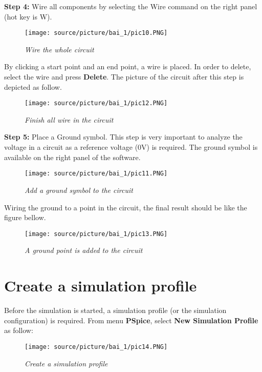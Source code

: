 \textbf{Step 4: } Wire all components by selecting the Wire command on the right panel (hot key is W).

\begin{figure}[!htp]
    \centering
    \texttt{[image: source/picture/bai\_1/pic10.PNG]}
    \caption{\textit{Wire the whole circuit}}
    \label{bai1_pic10}
\end{figure}

By clicking a start point and an end point, a wire is placed. In order to delete, select the wire and press \textbf{Delete}. The picture of the circuit after this step is depicted as follow.
\newpage
\begin{figure}[!htp]
    \centering
    \texttt{[image: source/picture/bai\_1/pic12.PNG]}
    \caption{\textit{Finish all wire in the circuit}}
    \label{bai1_pic12}
\end{figure}

\textbf{Step 5: } Place a Ground symbol. This step is very important to analyze the voltage in a circuit as a reference voltage (0V) is required. The ground symbol is available on the right panel of the software.
\begin{figure}[!htp]
    \centering
    \texttt{[image: source/picture/bai\_1/pic11.PNG]}
    \caption{\textit{Add a ground symbol to the circuit}}
    \label{bai1_pic11}
\end{figure}

Wiring the ground to a point in the circuit, the final result should be like the figure bellow.

\begin{figure}[!htp]
    \centering
    \texttt{[image: source/picture/bai\_1/pic13.PNG]}
    \caption{\textit{A ground point is added to the circuit}}
    \label{bai1_pic13}
\end{figure}

\section{Create a simulation profile}
Before the simulation is started, a simulation profile (or the simulation configuration) is required. From menu \textbf{PSpice}, select \textbf{New Simulation Profile} as follow:
\begin{figure}[!htp]
    \centering
    \texttt{[image: source/picture/bai\_1/pic14.PNG]}
    \caption{\textit{Create a simulation profile}}
    \label{bai1_pic14}
\end{figure}

